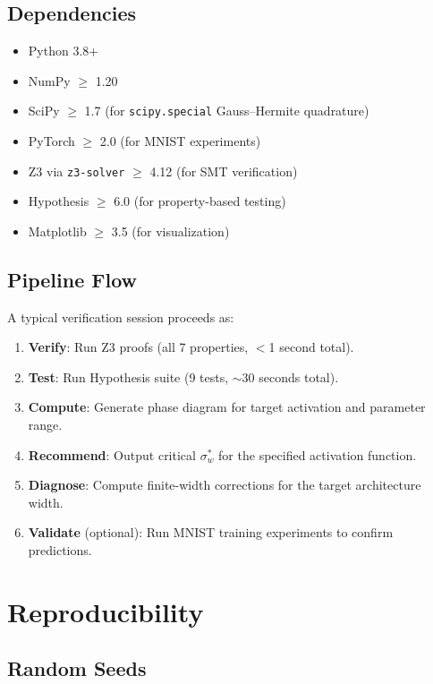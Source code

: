 \documentclass[10pt]{article}
\begin{document}
\subsection{Dependencies}

\begin{itemize}[nosep]
    \item Python 3.8+
    \item NumPy $\geq$ 1.20
    \item SciPy $\geq$ 1.7 (for \texttt{scipy.special} Gauss--Hermite quadrature)
    \item PyTorch $\geq$ 2.0 (for MNIST experiments)
    \item Z3 via \texttt{z3-solver} $\geq$ 4.12 (for SMT verification)
    \item Hypothesis $\geq$ 6.0 (for property-based testing)
    \item Matplotlib $\geq$ 3.5 (for visualization)
\end{itemize}

\subsection{Pipeline Flow}

A typical verification session proceeds as:
\begin{enumerate}[nosep]
    \item \textbf{Verify}: Run Z3 proofs (all 7 properties, $<$1 second total).
    \item \textbf{Test}: Run Hypothesis suite (9 tests, $\sim$30 seconds total).
    \item \textbf{Compute}: Generate phase diagram for target activation and parameter range.
    \item \textbf{Recommend}: Output critical $\sigma_w^*$ for the specified activation function.
    \item \textbf{Diagnose}: Compute finite-width corrections for the target architecture width.
    \item \textbf{Validate} (optional): Run MNIST training experiments to confirm predictions.
\end{enumerate}


\section{Reproducibility}
\label{app:reproducibility}

\subsection{Random Seeds}
\end{document}
